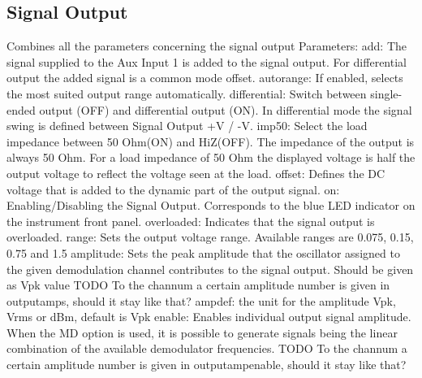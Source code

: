 \documentclass[11pt]{article} %
\begin{document}
\subsection{Signal Output}
    Combines all the parameters concerning the signal output
    Parameters:
            add: The signal supplied to the Aux Input 1 is added to the signal 
                output. For differential output the added signal is a common mode 
                offset.
            autorange: If enabled, selects the most suited output range automatically.
            differential: Switch between single-ended output (OFF) and differential 
                output (ON). In differential mode the signal swing is defined between 
                Signal Output +V / -V.
            imp50: Select the load impedance between 50 Ohm(ON) and HiZ(OFF). 
                The impedance of the output is always 50 Ohm. For a load impedance
                of 50 Ohm the displayed voltage is half the output voltage to 
                reflect the voltage seen at the load.
            offset: Defines the DC voltage that is added to the dynamic part of 
                the output signal.
            on: Enabling/Disabling the Signal Output. Corresponds to the blue 
                LED indicator on the instrument front panel.
            overloaded: Indicates that the signal output is overloaded.
            range: Sets the output voltage range. Available ranges are 0.075, 0.15,
                0.75 and 1.5
            amplitude: Sets the peak amplitude that the oscillator assigned to 
                the given demodulation channel contributes to the signal output.
                Should be given as Vpk value
                TODO To the channum a certain amplitude number is given in 
                outputamps, should it stay like that?
            ampdef: the unit for the amplitude Vpk, Vrms or dBm, default is Vpk
            enable: Enables individual output signal amplitude. When the MD 
                option is used, it is possible to generate signals being the 
                linear combination of the available demodulator frequencies.
                TODO To the channum a certain amplitude number is given in 
                outputampenable, should it stay like that?
\end{document}
